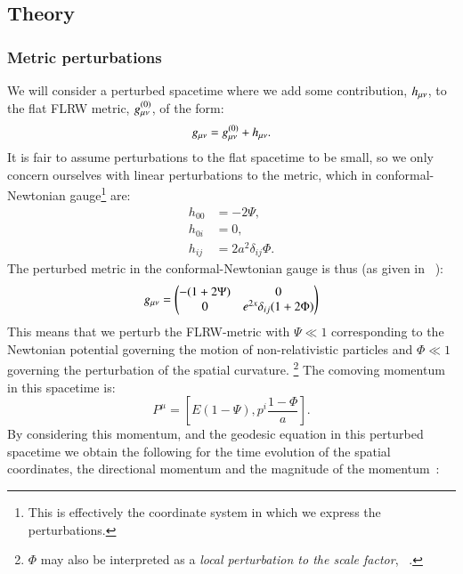 \subsection{Theory}\label{sec:m3:theory}

\subsubsection{Metric perturbations}
    We will consider a perturbed spacetime where we add some contribution, $h_{\mu\nu}$, to the flat FLRW metric, $g_{\mu\nu}^{(0)}$, of the form:
    \begin{equation}
        g_{\mu\nu} = g_{\mu\nu}^{(0)} + h_{\mu\nu}.
    \end{equation}
    It is fair to assume perturbations to the flat spacetime to be small, so we only concern ourselves with linear perturbations to the metric, which in conformal-Newtonian gauge\footnote{This is effectively the coordinate system in which we express the perturbations.} are:
    \begin{equation}
        \begin{split}
            h_{00} &= -2\Psi, \\
            h_{0i} &= 0,\\
            h_{ij} &= 2a^2\delta_{ij}\Phi.
        \end{split}
    \end{equation}
    The perturbed metric in the conformal-Newtonian gauge is thus (as given in ~\cite{https://doi.org/10.48550/arxiv.astro-ph/0606683}):
    \begin{equation}\label{eq:m3:theory:perturbed_metric}
        g_{\mu\nu} = \begin{pmatrix}
            -(1+2\Psi) & 0 \\
            0 & e^{2x}\delta_{ij}(1+2\Phi)
        \end{pmatrix}
    \end{equation}
    This means that we perturb the FLRW-metric with $\Psi\ll1$ corresponding to the Newtonian potential governing the motion of non-relativistic particles and $\Phi\ll1$ governing the perturbation of the spatial curvature. \footnote{$\Phi$ may also be interpreted as a \textit{local perturbation to the scale factor}, ~\cite{dodelson2020modern}.} The comoving momentum in this spacetime is:
    \begin{equation}
        P^\mu = \left[E(1-\Psi), p^i\frac{1-\Phi}{a}\right].
    \end{equation}
    By considering this momentum, and the geodesic equation in this perturbed spacetime we obtain the following for the time evolution of the spatial coordinates, the directional momentum and the magnitude of the momentum~\cite[Eqs. 3.62, 3.69, 3.71]{dodelson2020modern}:
